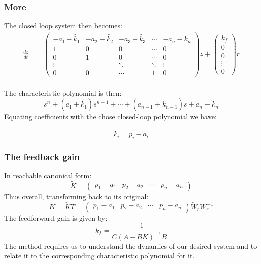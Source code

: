 \documentclass{beamer}
\theoremstyle{remark}
\begin{document}
\begin{frame}
\frametitle{More}
The closed loop system then becomes: 
\begin{equation}
\begin{aligned}
\frac{dz}{dt}
&=
\begin{pmatrix}
-a_1 - \tilde{k_1} & -a_2- \tilde{k_2} & -a_3 - \tilde{k_3} & \cdots & -a_n  - k_n \\
1 & 0 & 0 & \cdots & 0 \\
0 & 1 & 0 & \cdots & 0 \\
\vdots & & \ddots & \ddots & \vdots \\
0 & 0 & \cdots & 1 & 0
\end{pmatrix}
z
+
\begin{pmatrix}
k_f \\ 0 \\ 0 \\ \vdots \\ 0
\end{pmatrix}
r \\
\end{aligned}
\end{equation}

The characteristic polynomial is then: 
\begin{equation}
    s^n + (a_1 + \tilde{k_1})s^{n-1} + \cdots + (a_{n-1} + \tilde{k}_{n-1})s + a_n + \tilde{k}_n
\end{equation}
Equating coefficients with 
the chose closed-loop polynomial we have: 

\begin{equation}
    \tilde{k}_i = p_i - a_i
\end{equation}
\end{frame}

\begin{frame}
\frametitle{The feedback gain}
In reachable canonical form:
\begin{equation}
    \tilde{K} = 
    \begin{pmatrix}
        p_1 - a_1 & p_2 - a_2 & \cdots & p_n - a_n
    \end{pmatrix}
\end{equation}
Thus overall, transforming back to its original: 
\begin{equation}
    K = \tilde{K}T = 
    \begin{pmatrix}
        p_1 - a_1 & p_2 - a_2 & \cdots & p_n - a_n
    \end{pmatrix} 
    \tilde{W}_r W_r^{-1}
\end{equation}
The feedforward gain is given by: 
\begin{equation}
    k_f = \frac{-1}{C(A-BK)^{-1}B}
\end{equation}
The method requires us to understand the dynamics of our desired system 
and to relate it to the corresponding characteristic polynomial for it. 
\end{frame}
\end{document}
